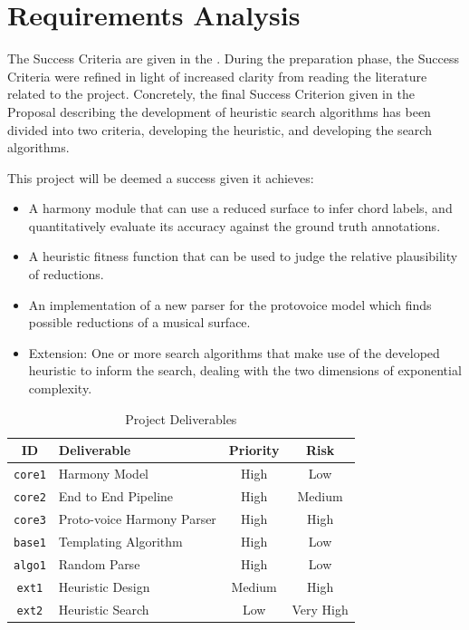\documentclass[12pt,a4paper,twoside,openany]{report} \usepackage[pdfborder={0 0 0}]{hyperref}    %
\theoremstyle{definition} \newtheorem{definition}{Definition}[section]
\begin{document}
\section{Requirements Analysis}
\label{sec:requirementsAnalysis}
The Success Criteria are given in the . During the preparation phase, the Success Criteria were
refined in light of increased clarity from reading the literature related to the project. Concretely, the final Success
Criterion given in the Proposal describing the development of heuristic search algorithms has been divided into two
criteria, developing the heuristic, and developing the search algorithms.

This project will be deemed a success given it achieves: 
\begin{itemize} 
  \item A harmony module that can use a reduced surface to infer chord labels, and quantitatively evaluate its accuracy against the ground truth annotations. 
  \item A heuristic fitness function that can be used to judge the relative plausibility of reductions. 
  \item An implementation of a new parser for the protovoice model which finds possible reductions of a musical surface. 
  \item Extension: One or more search algorithms that make use of the developed heuristic to inform the search, dealing with the two dimensions of exponential complexity. 
\end{itemize} 

\begin{table}[ht] \caption{Project Deliverables} 
  \vspace{\baselineskip} 
  \label{tab:deliverables} 
  \centering
  \begin{tabularx}{0.9\textwidth}{cXcc} 
    {\large \textbf{ID}} & \large \textbf{Deliverable} & \large \textbf{Priority} & \large \textbf{Risk} \\ 
    \toprule 
    \texttt{core1} & Harmony Model & High & Low \\ 
    \texttt{core2} & End to End Pipeline & High & Medium \\ 
    \texttt{core3} & Proto-voice Harmony Parser & High & High \\ 
    \texttt{base1} & Templating Algorithm & High & Low \\ 
    \texttt{algo1} & Random Parse & High & Low \\ 
    \texttt{ext1} & Heuristic Design & Medium & High \\
    \texttt{ext2} & Heuristic Search & Low & Very High \\
\end{tabularx} \end{table}
\end{document}
